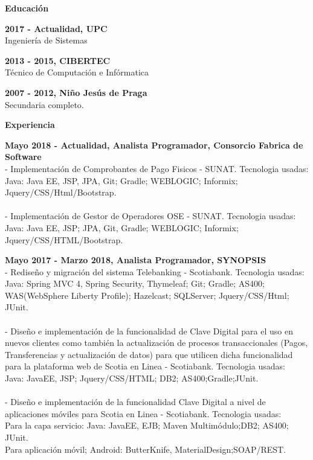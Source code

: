 \documentclass[a4paper,12pt,final]{memoir}
\newcommand{\Sep}{\vspace{1.5em}}
\newcommand{\SmallSep}{\vspace{0.5em}}
\newcommand{\CVSection}[1]
	{\Large\textbf{#1}\par
	\SmallSep\normalsize\normalfont}
\newcommand{\CVItem}[1]
	{\textbf{\color{RoyalBlue} #1}}
\begin{document}
\CVSection{Educación}
\CVItem{2017 - Actualidad, UPC}\\
Ingeniería de Sistemas
\SmallSep

\CVItem{2013 - 2015, CIBERTEC}\\
Técnico de Computación e Infórmatica
\SmallSep

\CVItem{2007 - 2012, Niño Jesús de Praga}\\
Secundaria completo.
\Sep

\CVSection{Experiencia}
\CVItem{Mayo 2018 - Actualidad, Analista Programador, Consorcio Fabrica de Software}\\
- Implementación de Comprobantes de Pago Fisicos - SUNAT. Tecnologia usadas:\\
Java: Java EE, JSP, JPA, Git; Gradle; WEBLOGIC; Informix; Jquery/CSS/Html/Bootstrap.\\\\
- Implementación de Gestor de Operadores OSE - SUNAT. Tecnologia usadas:\\
Java: Java EE, JSP; JPA, Git, Gradle; WEBLOGIC; Informix; Jquery/CSS/HTML/Bootstrap.
\SmallSep

\CVItem{Mayo 2017 - Marzo 2018, Analista Programador, SYNOPSIS}\\
- Rediseño y migración del sistema Telebanking - Scotiabank. Tecnologia usadas:\\
Java: Spring MVC 4, Spring Security, Thymeleaf; Git; Gradle; AS400; WAS(WebSphere Liberty Profile); Hazelcast; SQLServer; Jquery/CSS/Html; JUnit.\\\\
- Diseño e implementación de la funcionalidad de Clave Digital para el uso en nuevos clientes como también la actualización de procesos transaccionales (Pagos, Transferencias y actualización de datos) para que utilicen dicha funcionalidad para la plataforma web de Scotia en Linea - Scotiabank. Tecnologia usadas:\\
Java: JavaEE, JSP; Jquery/CSS/HTML; DB2; AS400;Gradle;JUnit.\\\\
- Diseño e implementación de la funcionalidad Clave Digital a nivel de aplicaciones móviles para Scotia en Linea - Scotiabank. Tecnologia usadas:\\
Para la capa servicio: Java: JavaEE, EJB; Maven Multimódulo;DB2; AS400; JUnit.\\
Para aplicación móvil; Android: ButterKnife, MaterialDesign;SOAP/REST.
\SmallSep

\clearpage
\end{document}
